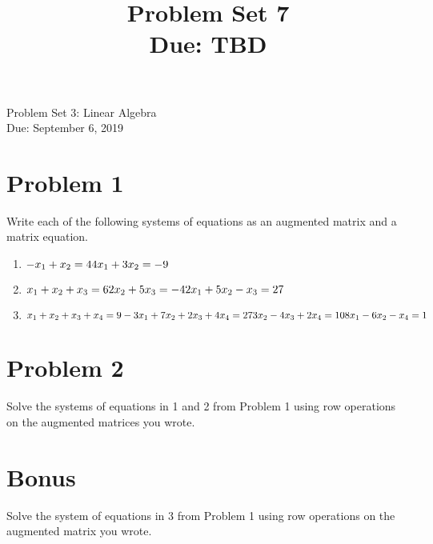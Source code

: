 \documentclass[11pt]{article}
\title{Problem Set 7\\ Due: TBD}%
\theoremstyle{definition}
\theoremstyle{remark}
\begin{document}
\begin{center}
{\huge Problem Set 3: Linear Algebra}\\[5pt]
Due: September 6, 2019
\end{center}

\section*{Problem 1}
Write each of the following systems of equations as an augmented matrix and a matrix equation.
\begin{enumerate}
\item
$
-x_1 + x_2 = 4 \\
4x_1 + 3x_2 = -9 
$

\item
$
x_1 + x_2 + x_3 = 6 \\
2x_2 + 5x_3 = -4 \\
2x_1 + 5x_2 -x_3 = 27 \\
$

\item
$
x_1 + x_2 + x_3 + x_4 = 9 \\
-3x_1 + 7x_2 + 2x_3 + 4x_4 = 27 \\
3x_2 - 4x_3 + 2x_4 = 10 \\
8x_1 - 6x_2 - x_4 = 1 \\
$


\end{enumerate}

\section*{Problem 2}
Solve the systems of equations in 1 and 2 from Problem 1 using row operations on the augmented matrices you wrote.

\section*{Bonus}
Solve the system of equations in 3 from Problem 1 using row operations on the augmented matrix you wrote.
\end{document}
